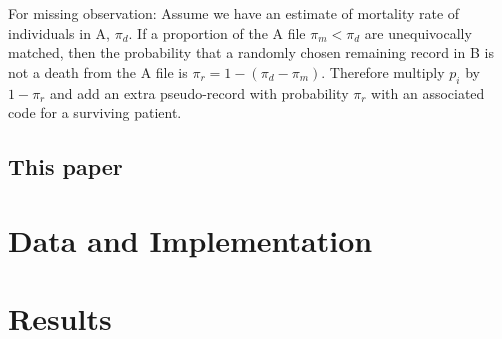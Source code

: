 \documentclass[12pt]{article}
\begin{document}
For missing observation: Assume we have an estimate of mortality rate of individuals in A, $\pi_d$.  If a proportion of the A file $\pi_m < \pi_d$ are unequivocally matched, then the probability that a randomly chosen remaining record in B is not a death from the A file is $\pi_r = 1 - (\pi_d - \pi_m)$.  Therefore multiply $p_i$ by $1-\pi_r$ and add an extra pseudo-record with probability $\pi_r$ with an associated code for a surviving patient. 



\subsection{This paper}


\section{Data and Implementation}

\section{Results}



\newpage
\singlespacing
 

\end{document}
